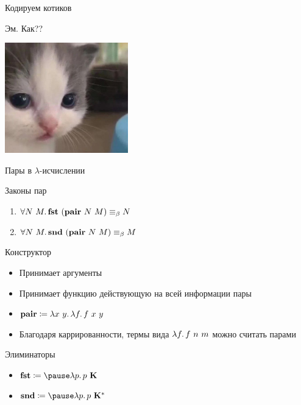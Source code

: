     \begin{frame}[fragile]{Кодируем котиков}
        \pause
        \begin{center}
            Эм. Как??
            \vspace{1em}

            \includegraphics[width=0.4\textwidth]{figs/wat}
        \end{center}
    \end{frame}

    \begin{frame}[fragile]{Пары в $\lambda$-исчислении}
        \begin{block}{Законы пар}
            \begin{enumerate}
                \item $\forall N~M\ldotp \mathbf{fst}~(\mathbf{pair}~N~M) \equiv_\beta N$
                \item $\forall N~M\ldotp \mathbf{snd}~(\mathbf{pair}~N~M) \equiv_\beta M$
            \end{enumerate}
        \end{block}
        \pause
        \begin{block}{Конструктор}
            \begin{itemize}
                \item Принимает аргументы
                \item Принимает функцию действующую на всей информации пары
                \item $\mathbf{pair} \coloneqq \lambda x~y\ldotp \lambda f \ldotp f ~ x ~ y$
                \item Благодаря каррированности, термы вида $\lambda f\ldotp f ~ n ~ m$ можно считать парами
            \end{itemize}
        \end{block}
        \pause
        \begin{block}{Элиминаторы}
            \begin{itemize}
                \item $\term{fst} \termdef \pause \lambda p \ldotp p \ap \term{K}$
                \item $\term{snd} \termdef \pause \lambda p \ldotp p \ap \term{K}^*$
            \end{itemize}
        \end{block}
    \end{frame}

